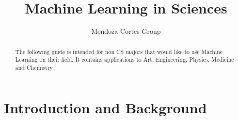 \documentclass[11pt,letterpaper]{report}
\author{Mendoza-Cortes Group}
\title{Machine Learning in Sciences}
\begin{document}
	
	\setcounter{page}{1}
	\thispagestyle{empty}
	
	
	
	
	\maketitle
	
	\newpage
	
	\tableofcontents
	
	\listoftables
	
	\listoffigures
	
	
	\clearpage
	\newpage
	\setcounter{page}{1}
	\pagestyle{fancy}
	
	
	
	
	\chapter{Introduction and Background}
	
	\begin{abstract}
		The following guide is intended for non CS majors that would like to use  Machine Learning on their field. It contains applications to Art, Engineering, Physics, Medicine and Chemistry.
	\end{abstract}
	
	\clearpage
	\newpage
	
\end{document}
